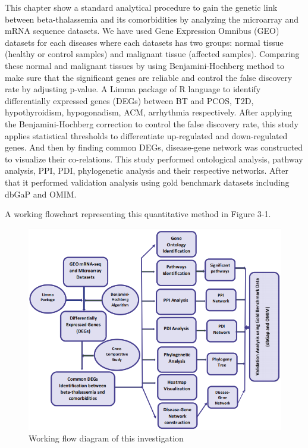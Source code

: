 This chapter show a standard analytical procedure to gain the genetic link between beta-thalassemia and its comorbidities by analyzing the microarray and mRNA sequence datasets. We have used Gene Expression Omnibus (GEO) datasets for each diseases where each datasets has two groups: normal tissue (healthy or control samples) and malignant tissue (affected samples). Comparing these normal and malignant tissues by using Benjamini-Hochberg method to make sure that the significant genes are reliable and control the false discovery rate by adjusting p-value. A Limma package of R language to identify differentially expressed genes (DEGs) between BT and PCOS, T2D, hypothyroidism, hypogonadism, ACM, arrhythmia respectively. After applying the Benjamini-Hochberg correction to control the false discovery rate, this study applies statistical thresholds to differentiate up-regulated and down-regulated genes. And then by finding common DEGs, disease-gene network was constructed to visualize their co-relations. This study performed ontological analysis, pathway analysis, PPI, PDI, phylogenetic analysis and their respective networks. After that it performed validation analysis using gold benchmark datasets including dbGaP and OMIM. 

A working flowchart representing this quantitative method in Figure 3-1.

\begin{figure}[H]
\begin{center}
    \includegraphics[width=15cm]{./fig/p1.PNG}
\end{center}
\caption{Working flow diagram of this investigation}
\label{fig:dataset_mass_images}
\end{figure}

